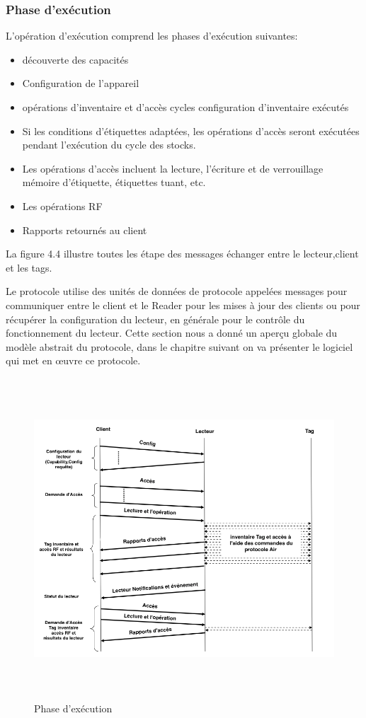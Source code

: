 \documentclass[11pt, a4paper, twoside]{book}
\begin{document}
\subsubsection{Phase d'exécution}
L'opération d'exécution comprend les phases d'exécution suivantes:
\begin{itemize}
\item découverte des capacités
\item Configuration de l'appareil
\item opérations d'inventaire et d'accès cycles configuration d'inventaire exécutés
\item Si les conditions d'étiquettes adaptées, les opérations d'accès seront exécutées pendant l'exécution du cycle des stocks.
\item Les opérations d'accès incluent la lecture, l'écriture et de verrouillage mémoire d'étiquette, étiquettes tuant, etc.
\item Les opérations RF
\item Rapports retournés au client
\end{itemize}

La figure 4.4 illustre toutes les étape des messages échanger entre le lecteur,client et les tags.

Le protocole utilise des unités de données de protocole appelées messages pour communiquer entre le client et le Reader pour  les mises à jour des clients ou pour récupérer la configuration du lecteur, en générale pour le contrôle du fonctionnement du lecteur. Cette section nous a donné un aperçu globale du modèle abstrait du protocole, dans le chapitre suivant on va présenter le logiciel qui met en œuvre ce protocole.
\begin{figure}[!h]
\centering
\includegraphics[height=12cm]{runtime}
\caption{Phase d'exécution}
\end{figure}
\pagebreak
\end{document}

